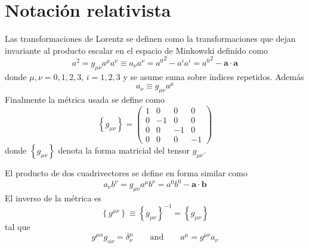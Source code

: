 \section{Notación relativista}
\label{sec:srn}
Las transformaciones de Lorentz se definen como la transformaciones que dejan invariante al producto escalar en el espacio de Minkowski definido como
\begin{equation}
  \label{eq:146qft}
  a^2=g_{\mu\nu}a^\mu a^\nu\equiv a_\nu a^\nu={a^0}^2-a^i a^i={a^0}^2-\mathbf{a}\cdot\mathbf{a}
\end{equation}
donde $\mu,\nu=0,1,2,3$, $i=1,2,3$ y se asume suma sobre índices repetidos. Además
\begin{equation}
\label{eq:149qft}
  a_\nu\equiv g_{\mu\nu}a^\mu
\end{equation}
 Finalmente la métrica usada se define como
\begin{equation}
  \label{eq:gmunu}
  \left\{ g_{\mu\nu} \right\}=
  \begin{pmatrix}
    1&0&0&0\\
    0&-1&0&0\\
    0&0&-1&0\\
    0&0&0&-1
  \end{pmatrix}
\end{equation}
donde $\left\{ g_{\mu\nu} \right\}$ denota la forma matricial del tensor $g_{\mu\nu}$.  

El producto de dos cuadrivectores se define en forma similar como
\begin{equation}
\label{eq:157qft}
  a_\nu b^\nu=g_{\mu\nu}a^\mu b^\nu=a^0b^0-\mathbf{a}\cdot\mathbf{b}
\end{equation}
El inverso de la métrica es
\begin{equation}
  \left\{ g^{\mu\nu} \right\}\equiv\left\{ g_{\mu\nu} \right\}^{-1}=\left\{ g_{\mu\nu} \right\}
\end{equation}
tal que
\begin{equation}
  g^{\mu\alpha}g_{\alpha\nu}=\delta^\mu_\nu\qquad\text{and}\qquad a^\mu=g^{\mu\nu}a_\nu
\end{equation}

